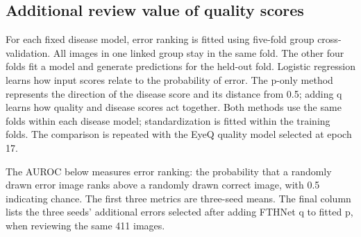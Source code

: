 \documentclass[
  10pt,
]{article}
\begin{document}
\subsection{Additional review value of quality
scores}\label{additional-review-value-of-quality-scores}

For each fixed disease model, error ranking is fitted using five-fold
group cross-validation. All images in one linked group stay in the same
fold. The other four folds fit a model and generate predictions for the
held-out fold. Logistic regression learns how input scores relate to the
probability of error. The p-only method represents the direction of the
disease score and its distance from 0.5; adding q learns how quality and
disease scores act together. Both methods use the same folds within each
disease model; standardization is fitted within the training folds. The
comparison is repeated with the EyeQ quality model selected at epoch 17.

The AUROC below measures error ranking: the probability that a randomly
drawn error image ranks above a randomly drawn correct image, with 0.5
indicating chance. The first three metrics are three-seed means. The
final column lists the three seeds' additional errors selected after
adding FTHNet q to fitted p, when reviewing the same 411 images.
\end{document}

